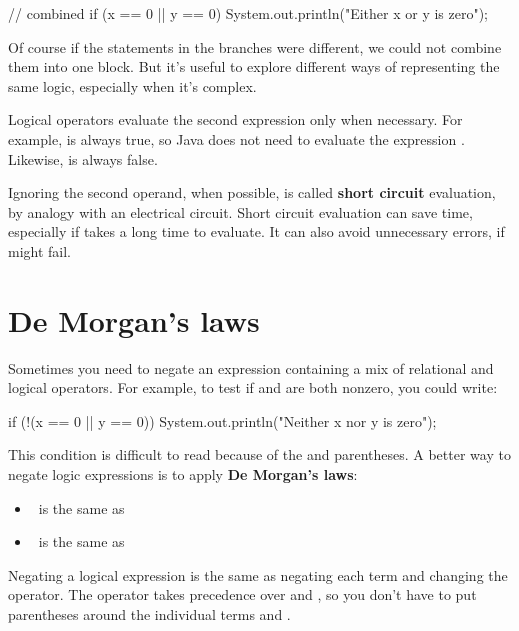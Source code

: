 \begin{code}
// combined
if (x == 0 || y == 0) {
    System.out.println("Either x or y is zero");
}
\end{code}

Of course if the statements in the branches were different, we could not combine them into one block.
But it's useful to explore different ways of representing the same logic, especially when it's complex.


Logical operators evaluate the second expression only when necessary.
For example,  is always true, so Java does not need to evaluate the expression .
Likewise,  is always false.

Ignoring the second operand, when possible, is called {\bf short circuit} evaluation, by analogy with an electrical circuit.
Short circuit evaluation can save time, especially if  takes a long time to evaluate.
It can also avoid unnecessary errors, if  might fail.


\section{De Morgan's laws}

Sometimes you need to negate an expression containing a mix of relational and logical operators.
For example, to test if  and  are both nonzero, you could write:

\begin{code}
if (!(x == 0 || y == 0)) {
    System.out.println("Neither x nor y is zero");
}
\end{code}


This condition is difficult to read because of the \java{!} and parentheses.
A better way to negate logic expressions is to apply {\bf De Morgan's laws}:

\begin{itemize}
\item {} ~is the same as~ 
\item {} ~is the same as~ 
\end{itemize}

Negating a logical expression is the same as negating each term and changing the operator.
The \java{!} operator takes precedence over \java{&&} and \java{||}, so you don't have to put parentheses around the individual terms  and .


